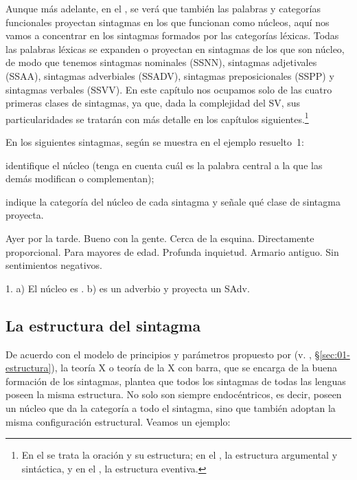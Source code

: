 Aunque más adelante, en el , se verá que también las palabras y
categorías funcionales proyectan sintagmas en los que funcionan como núcleos,
aquí nos vamos a concentrar en los sintagmas formados por las categorías
léxicas. Todas las palabras léxicas se expanden o proyectan en sintagmas de los
que son núcleo, de modo que tenemos sintagmas nominales (SSNN), sintagmas
adjetivales (SSAA), sintagmas adverbiales (SSADV), sintagmas preposicionales
(SSPP) y sintagmas verbales (SSVV). En este capítulo nos ocupamos solo de las
cuatro primeras clases de sintagmas, ya que, dada la complejidad del SV, sus
particularidades se tratarán con más detalle en los capítulos
siguientes.\footnote{En el  se trata la oración y su estructura; en el
, la estructura argumental y sintáctica, y en el , la
estructura eventiva.}

\begin{ejercicio}\label{ej:05-nucleo}
En los siguientes sintagmas, según se muestra en el ejemplo resuelto~1:

\begin{consignas}
  \item identifique el núcleo (tenga en cuenta cuál es la palabra central a la
        que las demás modifican o complementan);
  \item indique la categoría del núcleo de cada sintagma y señale qué clase de
        sintagma proyecta.
\end{consignas}

\begin{exe}
  \ex Ayer por la tarde.
  \ex Bueno con la gente.
  \ex Cerca de la esquina.
  \ex Directamente proporcional.
  \ex Para mayores de edad.
  \ex Profunda inquietud.
  \ex Armario antiguo.
  \ex Sin sentimientos negativos.
\end{exe}

\begin{resuelto}
1. a) El núcleo es . b)  es un adverbio y proyecta un
SAdv.
\end{resuelto}
\end{ejercicio}

\subsection{La estructura del sintagma}\label{sec:05-xbarra}

De acuerdo con el modelo de principios y parámetros propuesto por
\textcite{chomsky1981} (v. , §\ref{sec:01-estructura}), la teoría
X\prima{} o teoría de la X con barra, que se encarga de la buena formación de
los sintagmas, plantea que todos los sintagmas de todas las lenguas poseen la
misma estructura. No solo son siempre endocéntricos, es decir, poseen un núcleo
que da la categoría a todo el sintagma, sino que también adoptan la misma
configuración estructural. Veamos un ejemplo:

